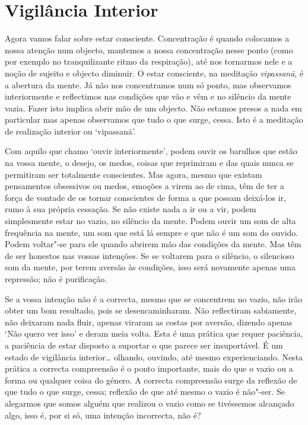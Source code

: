 \chapter{Vigilância Interior}

Agora vamos falar sobre estar consciente. Concentração é quando
colocamos a nossa atenção num objecto, mantemos a nossa concentração
nesse ponto (como por exemplo no tranquilizante ritmo da respiração),
até nos tornarmos nele e a noção de sujeito e objecto diminuir. O estar
consciente, na meditação \emph{vipassanā}, é a abertura da mente. Já não
nos concentramos num só ponto, mas observamos interiormente e
reflectimos nas condições que vão e vêm e no silêncio da mente vazia.
Fazer isto implica abrir mão de um objecto. Não estamos presos a nada em
particular mas apenas observamos que tudo o que surge, cessa. Isto é a
meditação de realização interior ou `vipassanā'.

Com aquilo que chamo `ouvir interiormente', podem ouvir os barulhos que
estão na vossa mente, o desejo, os medos, coisas que reprimiram e das
quais nunca se permitiram ser totalmente conscientes. Mas agora, mesmo
que existam pensamentos obsessivos ou medos, emoções a virem ao de cima,
têm de ter a força de vontade de os tornar conscientes de forma a que
possam deixá-los ir, rumo à sua própria cessação. Se não existe nada a
ir ou a vir, podem simplesmente estar no vazio, no silêncio da mente.
Podem ouvir um som de alta frequência na mente, um som que está lá
sempre e que não é um som do ouvido. Podem voltar"-se para ele quando
abrirem mão das condições da mente. Mas têm de ser honestos nas vossas
intenções. Se se voltarem para o silêncio, o silencioso som da mente,
por terem aversão às condições, isso será novamente apenas uma
repressão; não é purificação.

Se a vossa intenção não é a correcta, mesmo que se concentrem no vazio,
não irão obter um bom resultado, pois se desencaminharam. Não
reflectiram sabiamente, não deixaram nada fluir, apenas viraram as
costas por aversão, dizendo apenas `Não quero ver isso' e deram meia
volta. Esta é uma prática que requer paciência, a paciência de estar
disposto a suportar o que parece ser insuportável. É um estado de
vigilância interior\ldots{} olhando, ouvindo, até mesmo experienciando.
Nesta prática a correcta compreensão é o ponto importante, mais do que o
vazio ou a forma ou qualquer coisa do género. A correcta compreensão
surge da reflexão de que tudo o que surge, cessa; reflexão de que até
mesmo o vazio é não"-ser. Se alegarmos que somos alguém que realizou o
vazio como se tivéssemos alcançado algo, isso é, por si só, uma intenção
incorrecta, não é?

